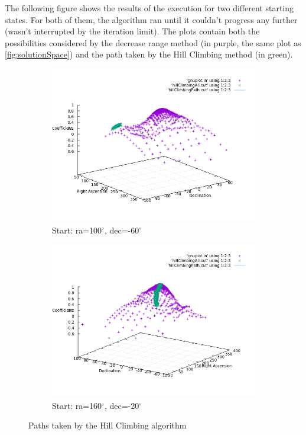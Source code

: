 The following figure shows the results of the execution for two different starting states. For both of them, the algorithm ran until it couldn't progress any further (wasn't interrupted by the iteration limit). The plots contain both the possibilities considered by the decrease range method (in purple, the same plot as \ref{fig:solutionSpace}) and the path taken by the Hill Climbing method (in green).

\begin{figure}[!htb]
	\begin{subfigure}[b]{0.5\textwidth}
		\includegraphics[width=\linewidth]{images/ch6/hillClimbing/resultsPathBad.png}
		\caption{Start: ra=100$^{\circ}$, dec=-60$^{\circ}$}
	\end{subfigure}
	\hfill
	\begin{subfigure}[b]{0.5\textwidth}
		\includegraphics[width=\linewidth]{images/ch6/hillClimbing/resultsPathGood.png}
		\caption{Start: ra=160$^{\circ}$, dec=-20$^{\circ}$}
	\end{subfigure}
	\caption{Paths taken by the Hill Climbing algorithm}
	\label{fig:hillClimbingPaths}
\end{figure}

